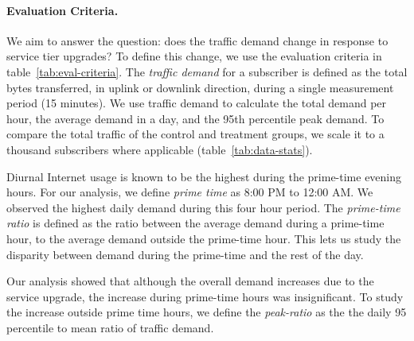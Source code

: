 \paragraph{Evaluation Criteria. } We aim to answer the question: does the 
traffic
demand change in response to service tier upgrades? To define this change, we 
use 
the evaluation criteria in table~\ref{tab:eval-criteria}. The \emph{traffic 
demand} for a subscriber is defined as the total bytes transferred, in 
uplink or downlink direction, during a single measurement period (15 minutes).
We use traffic demand to calculate the total demand per hour, the average demand 
in a day,
and the 95th percentile peak demand. To compare the total traffic of the
control and treatment groups, we scale it to a thousand subscribers where
applicable (table~\ref{tab:data-stats}).

Diurnal Internet usage is known to be the highest during the prime-time evening 
hours.
For our analysis, we define \emph{prime time} as 8:00 PM to 12:00 AM. We 
observed the highest
daily demand during this four hour period. The \emph{prime-time ratio} is 
defined as the ratio between 
the average demand during a prime-time hour, to the average demand outside the 
prime-time hour. This lets us study the disparity between demand during the
prime-time and the rest of the day.

Our analysis showed that although the overall demand increases due to the 
service upgrade, 
the increase during prime-time hours was insignificant. To study the increase 
outside
prime time hours, we define the \emph{peak-ratio} as the the daily 95 percentile 
to mean ratio
of traffic demand.







%